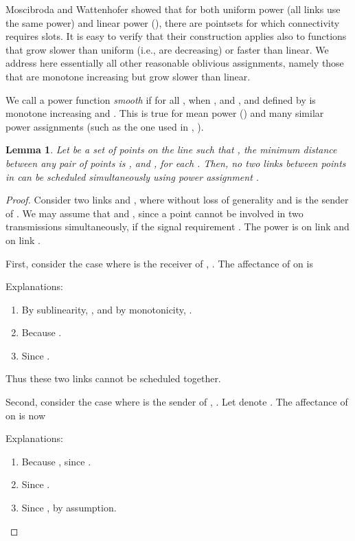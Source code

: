 \documentclass[11pt]{amsart}
\newcounter{foo}
\newtheorem{lemma}[foo]{Lemma}
\begin{document}
Moscibroda and Wattenhofer \cite{MoWa06} showed that for both uniform power (all links use the same power)
and linear power (), there are pointsets for which connectivity requires
 slots.  It is easy to verify that their construction
applies also to functions that grow slower than uniform (i.e., are decreasing)
or faster than linear.
We address here essentially all other reasonable
oblivious assignments, namely those that are monotone increasing but
grow slower than linear.  

We call a power function  
\emph{smooth} if  for all ,  when , and ,
and   defined by  is monotone
increasing and . This is true for mean power () and many similar power assignments (such as the
one used in \cite{DBLP:conf/wdag/KowalskiR10}, ).

\begin{lemma}
Let  be a set of points on the line such that , 
the minimum distance between any pair of points is , and 
, for each . 
Then, no two links between points in  can be scheduled simultaneously using power assignment .
\label{lem:incr1}
\end{lemma} 


\begin{proof}
Consider two links  and , where 
without loss of generality  and 
 is the sender of .  
We may assume that  and , since a point
cannot be involved in two transmissions simultaneously, if the signal
requirement .  The power is  on link  and  on link .

First, consider the case where  is the receiver of , . 
The affectance of  on  is

Explanations:
\begin{enumerate}
\item By sublinearity, , 
  and by monotonicity, .
\item Because .
\item Since .
\end{enumerate}
Thus these two links cannot be scheduled together.

Second, consider the case where  is the sender of , .  Let  denote .
The affectance of  on  is now

Explanations:
\begin{enumerate}
\item Because , since .
\item Since .
\item Since , by assumption.   \end{enumerate}
\vspace{-2em}
\end{proof}
\end{document}
